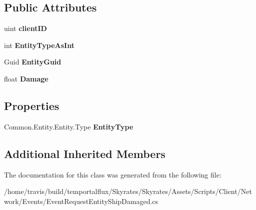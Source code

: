 \subsection*{Public Attributes}
\begin{DoxyCompactItemize}
\item 
\hypertarget{class_skyrates_1_1_client_1_1_network_1_1_event_1_1_event_request_entity_ship_damaged_ae096fc25a252dc81d9a721b3265bcf99}{uint {\bfseries client\-I\-D}}\label{class_skyrates_1_1_client_1_1_network_1_1_event_1_1_event_request_entity_ship_damaged_ae096fc25a252dc81d9a721b3265bcf99}

\item 
\hypertarget{class_skyrates_1_1_client_1_1_network_1_1_event_1_1_event_request_entity_ship_damaged_aa1ca6b110b90735e93238d21c3924ea5}{int {\bfseries Entity\-Type\-As\-Int}}\label{class_skyrates_1_1_client_1_1_network_1_1_event_1_1_event_request_entity_ship_damaged_aa1ca6b110b90735e93238d21c3924ea5}

\item 
\hypertarget{class_skyrates_1_1_client_1_1_network_1_1_event_1_1_event_request_entity_ship_damaged_ab19fe3a4a86aa9230fe9c15128372428}{Guid {\bfseries Entity\-Guid}}\label{class_skyrates_1_1_client_1_1_network_1_1_event_1_1_event_request_entity_ship_damaged_ab19fe3a4a86aa9230fe9c15128372428}

\item 
\hypertarget{class_skyrates_1_1_client_1_1_network_1_1_event_1_1_event_request_entity_ship_damaged_ab3f8cd68107133271b5d5280c351060e}{float {\bfseries Damage}}\label{class_skyrates_1_1_client_1_1_network_1_1_event_1_1_event_request_entity_ship_damaged_ab3f8cd68107133271b5d5280c351060e}

\end{DoxyCompactItemize}
\subsection*{Properties}
\begin{DoxyCompactItemize}
\item 
\hypertarget{class_skyrates_1_1_client_1_1_network_1_1_event_1_1_event_request_entity_ship_damaged_a2106bb07040230bf13920400c37cbc9b}{Common.\-Entity.\-Entity.\-Type {\bfseries Entity\-Type}}\label{class_skyrates_1_1_client_1_1_network_1_1_event_1_1_event_request_entity_ship_damaged_a2106bb07040230bf13920400c37cbc9b}

\end{DoxyCompactItemize}
\subsection*{Additional Inherited Members}


The documentation for this class was generated from the following file\-:\begin{DoxyCompactItemize}
\item 
/home/travis/build/temportalflux/\-Skyrates/\-Skyrates/\-Assets/\-Scripts/\-Client/\-Network/\-Events/Event\-Request\-Entity\-Ship\-Damaged.\-cs\end{DoxyCompactItemize}
